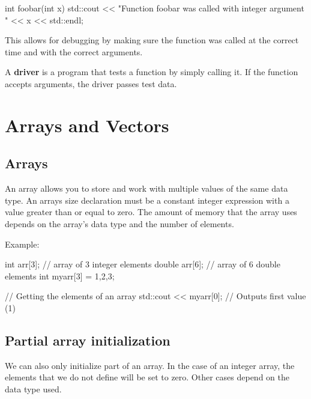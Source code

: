 \documentclass{report}
\begin{document}
    \begin{cppcode}
int foobar(int x) {
    std::cout << "Function foobar was called with integer argument " 
    << x 
    << std::endl;
}
    \end{cppcode}
    
    \bigbreak \noindent 
    This allows for debugging by making sure the function was called at the correct time and with the correct arguments.
    \bigbreak \noindent 
    \begin{concept}
 A \textbf{driver} is a program that tests a function by simply calling it. If the function accepts arguments, the driver passes test data.
	\end{concept}

    \pagebreak \bigbreak \noindent 
    \section{\LARGE Arrays and Vectors}
    \bigbreak \noindent 
    \subsection{Arrays}
    \bigbreak \noindent 
    \begin{concept}
 An array allows you to store and work with multiple values of the same data type. An arrays size declaration must be a constant integer expression with a value greater than or equal to zero. The amount of memory that the array uses depends on the array's data type and the number of elements.
	\end{concept}
    \bigbreak \noindent 
    Example:
    \bigbreak \noindent 
    
    \begin{cppcode}
int arr[3]; // array of 3 integer elements
double arr[6]; // array of 6 double elements
int myarr[3] = {1,2,3};

// Getting the elements of an array
std::cout << myarr[0]; // Outputs first value (1)
    \end{cppcode}
    
    \bigbreak \noindent 
    \bigbreak \noindent 

   \bigbreak \noindent 
   \subsection{Partial array initialization}
   \bigbreak \noindent 
   We can also only initialize part of an array. In the case of an integer array, the elements that we do not define will be set to zero. Other cases depend on the data type used.
   \bigbreak \noindent 
   
\end{document}
